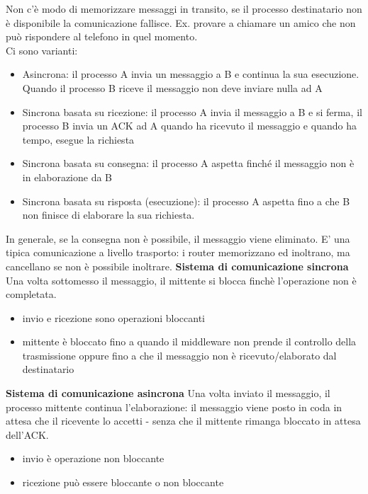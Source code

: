 \documentclass[12pt,italian]{report}
\begin{document}
Non c'è modo di memorizzare messaggi in transito, se il processo destinatario non è disponibile la comunicazione fallisce. Ex. provare a chiamare un amico che non può rispondere al telefono in quel momento. \\ Ci sono varianti:
\begin{itemize}
    \item Asincrona: il processo A invia un messaggio a B e continua la sua esecuzione. Quando il processo B riceve il messaggio non deve inviare nulla ad A
    \item Sincrona basata su ricezione: il processo A invia il messaggio a B e si ferma, il processo B invia un ACK ad A quando ha ricevuto il messaggio e quando ha tempo, esegue la richiesta
    \item Sincrona basata su consegna: il processo A aspetta finché il messaggio non è in elaborazione da B
    \item Sincrona basata su risposta (esecuzione): il processo A aspetta fino a che B non finisce di elaborare la sua richiesta. 
\end{itemize}
In generale, se la consegna non è possibile, il messaggio viene eliminato. E' una tipica comunicazione a livello trasporto: i router memorizzano ed inoltrano, ma cancellano se non è possibile inoltrare. 
\bigbreak
\noindent \textbf{Sistema di comunicazione sincrona}
\noindent Una volta sottomesso il messaggio, il mittente si blocca finchè l'operazione non è completata. 
\begin{itemize}
    \item invio e ricezione sono operazioni bloccanti
    \item mittente è bloccato fino a quando il middleware non prende il controllo della trasmissione oppure fino a che il messaggio non è ricevuto/elaborato dal destinatario 
\end{itemize}

\bigbreak
\noindent \textbf{Sistema di comunicazione asincrona}
\noindent Una volta inviato il messaggio, il processo mittente continua l'elaborazione: il messaggio  viene posto in coda in attesa che il ricevente lo accetti - senza che il mittente rimanga bloccato in attesa dell'ACK. 
\begin{itemize}
    \item invio è operazione non bloccante
    \item ricezione può essere bloccante o non bloccante
\end{itemize}
\end{document}
